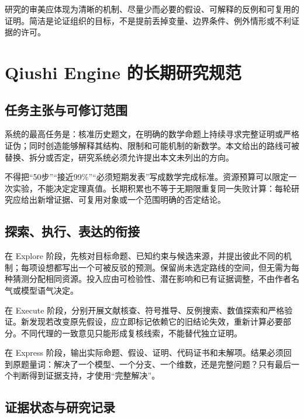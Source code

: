 \documentclass[11pt,a4paper]{article}
\theoremstyle{definition}
\begin{document}
研究的审美应体现为清晰的机制、尽量少而必要的假设、可解释的反例和可复用的证明。简洁是论证组织的目标，不是提前丢掉变量、边界条件、例外情形或不利证据的许可。

\section{Qiushi Engine 的长期研究规范}\label{sec:engine}

\subsection{任务主张与可修订范围}

系统的最高任务是：核准历史题文，在明确的数学命题上持续寻求完整证明或严格证伪；同时创造能够解释其结构、限制和可能机制的新数学。本文给出的路线可被替换、拆分或否定，研究系统必须允许提出本文未列出的方向。

不得把“50步”“接近99\%”“必须短期发表”写成数学完成标准。资源预算可以限定一次实验，不能决定定理真值。长期积累也不等于无期限重复同一失败计算：每轮研究应给出新增证据、可复用对象或一个范围明确的否定结论。

\subsection{探索、执行、表达的衔接}

在 Explore 阶段，先核对目标命题、已知约束与候选来源，并提出彼此不同的机制；每项设想都写出一个可被反驳的预测。保留尚未选定路线的空间，但无需为每种猜测分配相同资源。投入应由可检验性、潜在影响和已有证据调整，不由作者名气或模型语气决定。

在 Execute 阶段，分别开展文献核查、符号推导、反例搜索、数值探索和严格验证。新发现若改变原先假设，应立即标记依赖它的旧结论失效，重新计算必要部分。不同代理的一致意见只能形成复核线索，不能替代独立证明。

在 Express 阶段，输出实际命题、假设、证明、代码证书和未解项。结果必须回到原题量词：解决了一个模型、一个分支、一个维数，还是完整问题？只有最后一个判断得到证据支持，才使用“完整解决”。

\subsection{证据状态与研究记录}
\end{document}
